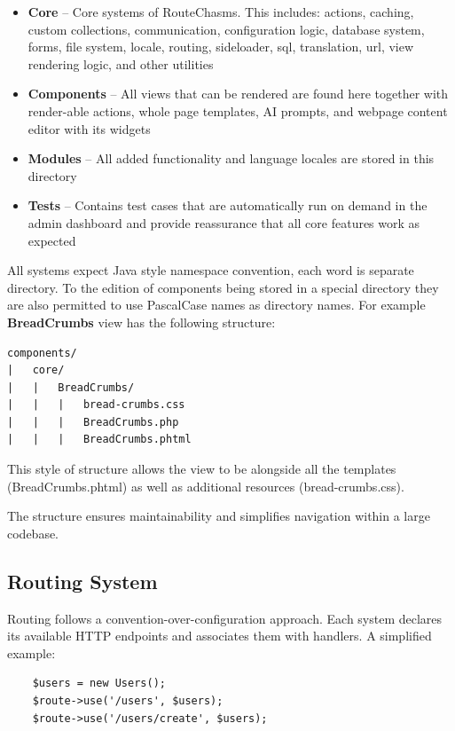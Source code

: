 \begin{itemize}
    \item \textbf{Core} -- Core systems of RouteChasms. This includes: actions, caching, custom collections,
        communication, configuration logic, database system, forms, file system, locale, routing, sideloader, sql,
        translation, url, view rendering logic, and other utilities
    \item \textbf{Components} -- All views that can be rendered are found here together with render-able actions,
        whole page templates, AI prompts, and webpage content editor with its widgets
    \item \textbf{Modules} -- All added functionality and language locales are stored in this directory
    \item \textbf{Tests} -- Contains test cases that are automatically run on demand in the admin dashboard and provide
        reassurance that all core features work as expected
\end{itemize}

All systems expect Java style namespace convention, each word is separate directory.
To the edition of components being stored in a special directory they are also permitted to use PascalCase names as
directory names.
For example \textbf{BreadCrumbs} view has the following structure:

\begin{verbatim}
components/
|   core/
|   |   BreadCrumbs/
|   |   |   bread-crumbs.css
|   |   |   BreadCrumbs.php
|   |   |   BreadCrumbs.phtml
\end{verbatim}

This style of structure allows the view to be alongside all the templates (BreadCrumbs.phtml) as well as additional
resources (bread-crumbs.css).

The structure ensures maintainability and simplifies navigation within a large codebase.

\subsection{Routing System}\label{subsec:routing-system}
Routing follows a convention-over-configuration approach.
Each system declares its available HTTP endpoints and associates them with handlers.
A simplified example:

\begin{verbatim}
    $users = new Users();
    $route->use('/users', $users);
    $route->use('/users/create', $users);
\end{verbatim}

